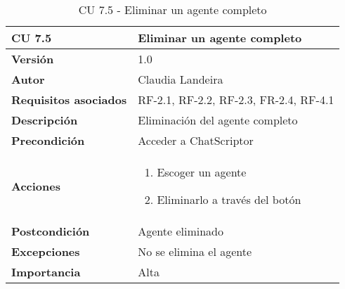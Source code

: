 \begin{table}[p]
	\centering
	\begin{tabularx}{\linewidth}{ p{} p{} }
		\toprule
		\textbf{CU 7.5}    & \textbf{Eliminar un agente completo}\\
		\toprule
		\textbf{Versión}              & 1.0    \\
		\textbf{Autor}                & Claudia Landeira \\
		\textbf{Requisitos asociados} & RF-2.1, RF-2.2, RF-2.3, FR-2.4, RF-4.1\\
		\textbf{Descripción}          & Eliminación del agente completo\\
		\textbf{Precondición}         & Acceder a ChatScriptor\\
		\textbf{Acciones}             &
		\begin{enumerate}
			\def\labelenumi{\arabic{enumi}.}
			\tightlist
                \item Escoger un agente
                \item Eliminarlo a través del botón
		\end{enumerate}\\
		\textbf{Postcondición}        & Agente eliminado  \\
		\textbf{Excepciones}          & No se elimina el agente \\
		\textbf{Importancia}          & Alta \\
		\bottomrule
	\end{tabularx}
	\caption{CU 7.5 - Eliminar un agente completo}
\end{table}

